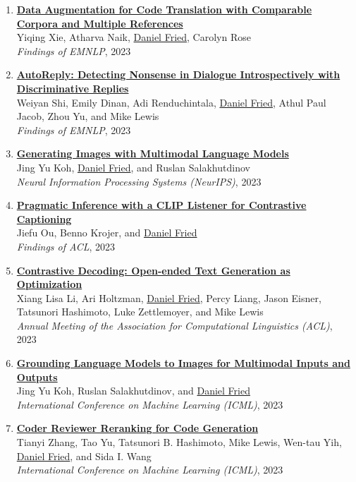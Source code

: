 \begin{enumerate}[leftmargin=-1mm,partopsep=0pt]
\item \href{https://arxiv.org/abs/2311.00317}{\textbf{Data Augmentation for Code Translation with Comparable Corpora and Multiple References}} \\
  Yiqing Xie, Atharva Naik, \underline{Daniel Fried}, Carolyn Rose\\
  \emph{Findings of EMNLP}, 2023

\item \href{https://arxiv.org/abs/2211.12615}{\textbf{AutoReply: Detecting Nonsense in Dialogue Introspectively with Discriminative Replies}} \\
  Weiyan Shi, Emily Dinan, Adi Renduchintala, \underline{Daniel Fried}, Athul Paul Jacob, Zhou Yu, and Mike Lewis\\
  \emph{Findings of EMNLP}, 2023

\item \href{https://arxiv.org/abs/2305.17216}{\textbf{Generating Images with Multimodal Language Models}} \\
  Jing Yu Koh, \underline{Daniel Fried}, and Ruslan Salakhutdinov\\
  \emph{Neural Information Processing Systems (NeurIPS)}, 2023

\item \href{https://arxiv.org/abs/2306.08818}{\textbf{Pragmatic Inference with a CLIP Listener for Contrastive Captioning}} \\
  Jiefu Ou, Benno Krojer, and \underline{Daniel Fried}\\
  \emph{Findings of ACL}, 2023

\item \href{https://arxiv.org/abs/2210.15097}{\textbf{Contrastive Decoding: Open-ended Text Generation as Optimization}} \\
  Xiang Lisa Li, Ari Holtzman, \underline{Daniel Fried}, Percy Liang, Jason Eisner, Tatsunori Hashimoto, Luke Zettlemoyer, and Mike Lewis\\
  \emph{Annual Meeting of the Association for Computational Linguistics (ACL)}, 2023

\item \href{https://arxiv.org/abs/2301.13823}{\textbf{Grounding Language Models to Images for Multimodal Inputs and Outputs}} \\
  Jing Yu Koh, Ruslan Salakhutdinov, and \underline{Daniel Fried}\\
  \emph{International Conference on Machine Learning (ICML)}, 2023

\item \href{https://arxiv.org/abs/2211.16490}{\textbf{Coder Reviewer Reranking for Code Generation}} \\
  Tianyi Zhang, Tao Yu, Tatsunori B. Hashimoto, Mike Lewis, Wen-tau Yih, \underline{Daniel Fried}, and Sida I. Wang\\
  \emph{International Conference on Machine Learning (ICML)}, 2023


\end{enumerate}
